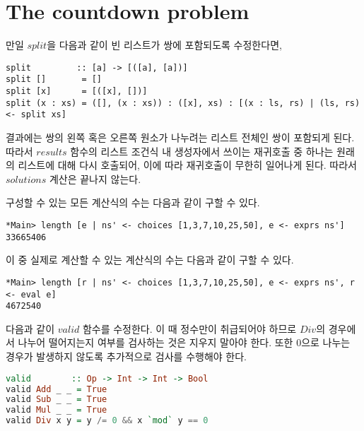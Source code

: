 \chapter{\Large{The countdown problem}}



만일 $split$을 다음과 같이 빈 리스트가 쌍에 포함되도록 수정한다면,
\begin{lstlisting}
split         :: [a] -> [([a], [a])]
split []       = []
split [x]      = [([x], [])]
split (x : xs) = ([], (x : xs)) : ([x], xs) : [(x : ls, rs) | (ls, rs) <- split xs]
\end{lstlisting}

\noindent
결과에는 쌍의 왼쪽 혹은 오른쪽 원소가 나누려는 리스트 전체인 쌍이 포함되게
된다. 따라서 $results$ 함수의 리스트 조건식 내 생성자에서 쓰이는 재귀호출 중
하나는 원래의 리스트에 대해 다시 호출되어, 이에 따라 재귀호출이 무한히 일어나게
된다. 따라서 $solutions$ 계산은 끝나지 않는다.

구성할 수 있는 모든 계산식의 수는 다음과 같이 구할 수 있다.
\begin{lstlisting}
*Main> length [e | ns' <- choices [1,3,7,10,25,50], e <- exprs ns']
33665406
\end{lstlisting}

이 중 실제로 계산할 수 있는 계산식의 수는 다음과 같이 구할 수 있다.
\begin{lstlisting}
*Main> length [r | ns' <- choices [1,3,7,10,25,50], e <- exprs ns', r <- eval e]
4672540
\end{lstlisting}

다음과 같이 $valid$ 함수를 수정한다. 이 때 정수만이 취급되어야 하므로 $Div$의
경우에서 나누어 떨어지는지 여부를 검사하는 것은 지우지 말아야 한다. 또한
$0$으로 나누는 경우가 발생하지 않도록 추가적으로 검사를 수행해야 한다.

\begin{lstlisting}[language=Haskell]
valid        :: Op -> Int -> Int -> Bool
valid Add _ _ = True
valid Sub _ _ = True
valid Mul _ _ = True
valid Div x y = y /= 0 && x `mod` y == 0
\end{lstlisting}

